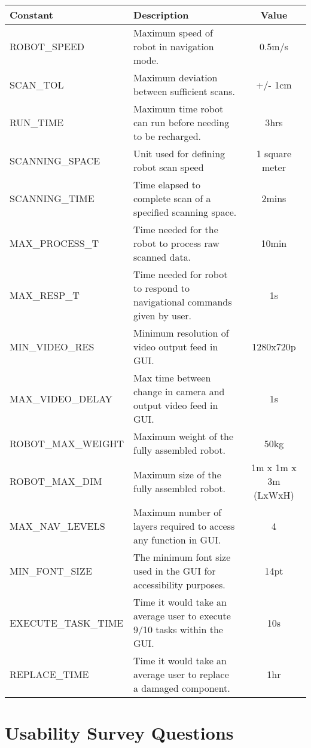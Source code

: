 \documentclass[12pt, titlepage]{article}
\newcommand{\RobotSpeed}{0.5m/s}
\newcommand{\ScanTolerance}{+/- 1cm}
\newcommand{\BatteryLife}{3hrs}
\newcommand{\ScanningSpace}{1 square meter}
\newcommand{\ScanningTime}{2mins}
\newcommand{\MaxProcessingTime}{10min}
\newcommand{\MaxResponseTime}{1s}
\newcommand{\MinVideoResolution}{1280x720p}
\newcommand{\MaxVideoDelay}{1s}
\newcommand{\RobotMaxWeight}{50kg}
\newcommand{\RobotMaxDimensions}{1m x 1m x 3m (LxWxH)}
\newcommand{\MaxNavLevels}{4}
\newcommand{\MinFontSize}{14pt}
\newcommand{\ExecuteTaskTime}{10s}
\newcommand{\ReplaceTime}{1hr}
\begin{document}
\begin{tabular}{ | l | p{6cm} | c |}
  \hline
  \textbf{Constant} & \textbf{Description} & \textbf{Value} \\
  \hline
  ROBOT\_SPEED & Maximum speed of robot in navigation mode. & \RobotSpeed{} \\
  \hline
  SCAN\_TOL & Maximum deviation between sufficient scans. & \ScanTolerance{} \\
  \hline
  RUN\_TIME & Maximum time robot can run before needing to be recharged. & \BatteryLife{} \\
  \hline
  SCANNING\_SPACE & Unit used for defining robot scan speed & \ScanningSpace{} \\
  \hline
  SCANNING\_TIME & Time elapsed to complete scan of a specified scanning space. & \ScanningTime{} \\
  \hline
  MAX\_PROCESS\_T & Time needed for the robot to process raw scanned data. & \MaxProcessingTime{} \\
  \hline
  MAX\_RESP\_T & Time needed for robot to respond to navigational commands given by user. & \MaxResponseTime{} \\
  \hline
  MIN\_VIDEO\_RES & Minimum resolution of video output feed in GUI. & \MinVideoResolution{} \\
  \hline
  MAX\_VIDEO\_DELAY & Max time between change in camera and output video feed in GUI. & \MaxVideoDelay{} \\
  \hline
  ROBOT\_MAX\_WEIGHT & Maximum weight of the fully assembled robot. & \RobotMaxWeight{} \\
  \hline
  ROBOT\_MAX\_DIM & Maximum size of the fully assembled robot. & \RobotMaxDimensions{} \\
  \hline
  MAX\_NAV\_LEVELS & Maximum number of layers required to access any function in GUI. & \MaxNavLevels{} \\
  \hline
  MIN\_FONT\_SIZE & The minimum font size used in the GUI for accessibility purposes. & \MinFontSize{} \\
  \hline
  EXECUTE\_TASK\_TIME & Time it would take an average user to execute 9/10 tasks within the GUI. & \ExecuteTaskTime{} \\
  \hline
  REPLACE\_TIME & Time it would take an average user to replace a damaged component. & \ReplaceTime{} \\
  \hline
  
\end{tabular}

\section{Usability Survey Questions}
\label{Usability_Survey}
\end{document}
